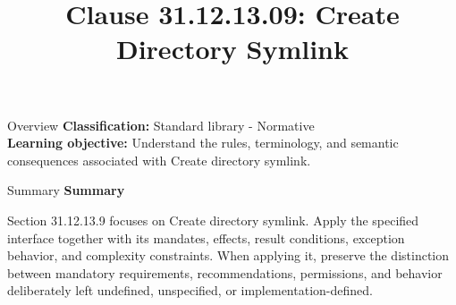 \documentclass[10pt,letterpaper]{article}
\title{Clause 31.12.13.09: Create Directory Symlink}
\author{}
\date{}
\begin{document}
\maketitle
\begin{CornellOverviewBox}{Overview}
\textbf{Classification:} Standard library - Normative\\[2pt]
\textbf{Learning objective:} Understand the rules, terminology, and semantic consequences associated with Create directory symlink.
\end{CornellOverviewBox}\begin{CornellSummaryBox}{Summary}
{\sffamily\bfseries\color{Accent} Summary}\par\vspace{3pt}Section 31.12.13.9 focuses on Create directory symlink. Apply the specified interface together with its mandates, effects, result conditions, exception behavior, and complexity constraints. When applying it, preserve the distinction between mandatory requirements, recommendations, permissions, and behavior deliberately left undefined, unspecified, or implementation-defined.
\end{CornellSummaryBox}
\end{document}
